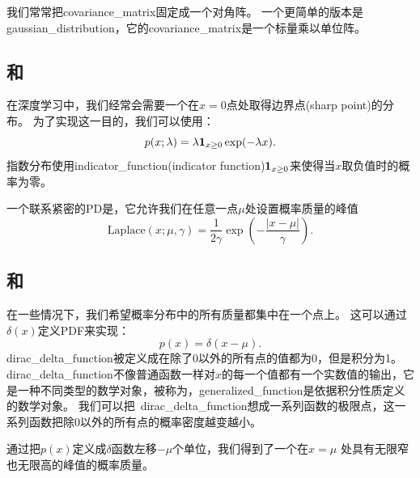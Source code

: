 
我们常常把\gls{covariance_matrix}固定成一个对角阵。
一个更简单的版本是\gls{gaussian_distribution}，它的\gls{covariance_matrix}是一个标量乘以单位阵。

\subsection{和}
\label{sec:exponential_and_laplace_distributions}

在深度学习中，我们经常会需要一个在$x=0$点处取得边界点(sharp point)的分布。
为了实现这一目的，我们可以使用：
\begin{equation}
p(x; \lambda) = \lambda \boldsymbol{1}_{x\ge 0} \exp(-\lambda x).
\end{equation}
指数分布使用\gls{indicator_function}(indicator function)$\boldsymbol{1}_{x\ge 0}$来使得当$x$取负值时的概率为零。

一个联系紧密的\gls{PD}是，它允许我们在任意一点$\mu$处设置概率质量的峰值
\begin{equation}
\label{eq:chap3_laplace}
\text{Laplace}(x; \mu, \gamma) = \frac{1}{2\gamma} \exp \left( -\frac{|x-\mu|}{\gamma}  \right).
\end{equation}

\subsection{和}
\label{sec:the_dirac_distribution_and_empirical_distribution}

在一些情况下，我们希望概率分布中的所有质量都集中在一个点上。
这可以通过 $\delta(x)$定义\gls{PDF}来实现：
\begin{equation}
p(x) = \delta(x-\mu).
\end{equation}
\gls{dirac_delta_function}被定义成在除了0以外的所有点的值都为0，但是积分为1。
\gls{dirac_delta_function}不像普通函数一样对$x$的每一个值都有一个实数值的输出，它是一种不同类型的数学对象，被称为，\gls{generalized_function}是依据积分性质定义的数学对象。
我们可以把~\gls{dirac_delta_function}想成一系列函数的极限点，这一系列函数把除0以外的所有点的概率密度越变越小。


通过把$p(x)$定义成$\delta$函数左移$-\mu$个单位，我们得到了一个在$x=\mu$ 处具有无限窄也无限高的峰值的概率质量。

